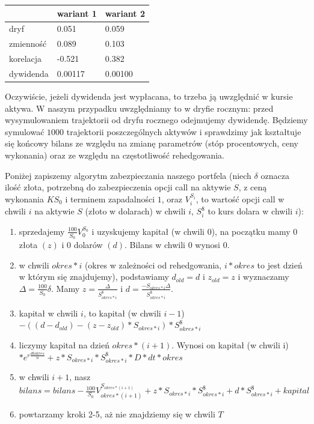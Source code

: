 \documentclass[12pt]{article}
\begin{document}
\begin{table}[h]
\begin{tabular}{|l|l|l|}
\hline
          & wariant 1 & wariant 2 \\ \hline
dryf      & 0.051     & 0.059     \\ \hline
zmienność & 0.089     & 0.103     \\ \hline
korelacja & -0.521    & 0.382     \\ \hline
dywidenda & 0.00117   & 0.00100   \\ \hline
\end{tabular}
\end{table}

\newline
Oczywiście, jeżeli dywidenda jest wypłacana, to trzeba ją uwzględnić w kursie aktywa. W naszym przypadku uwzględniamy to w dryfie rocznym: przed wysymulowaniem trajektorii od dryfu rocznego odejmujemy dywidendę.
\newline
Będziemy symulować $1000$ trajektorii poszczególnych aktywów i sprawdzimy jak kształtuje się końcowy bilans ze względu na zmianę parametrów (stóp procentowych, ceny wykonania) oraz ze względu na częstotliwość rehedgowania.


\newpage

Poniżej zapiszemy algorytm zabezpieczania naszego portfela (niech $\delta$ oznacza ilość złota, potrzebną do zabezpieczenia opcji call na aktywie $S$, z ceną wykonania $KS_0$ i terminem zapadalności $1$, oraz $V_i^{S_i}$, to wartość opcji call w chwili $i$ na aktywie $S$ (złoto w dolarach) w chwili $i$, $S_{i}^\$$ to kurs dolara w chwili $i$):
\begin{enumerate}
    \item sprzedajemy $\frac{100}{S_0}V_0^{S_0}$  i uzyskujemy kapitał (w chwili 0), na początku mamy $0$ złota $(z)$ i $0$ dolarów $(d)$. Bilans w chwili $0$ wynosi $0$.
    \item w chwili $okres*i$ (okres w zależności od rehedgowania, $i * okres$ to jest dzień w którym się znajdujemy), podstawiamy $d_{old}=d$ i $z_{old}=z$ i wyznaczamy $\Delta=\frac{100}{S_0}\delta$. Mamy $z=\frac{\Delta}{S_{okres*i}^\$}$ i $d=\frac{-S_{okres*i}\Delta}{S_{okres*i}^\$}$.
    \item kapitał w chwili $i$, to kapitał (w chwili $i-1$) $-((d-d_{old})-(z-z_{old})*S_{okres*i})*S_{okres*i}^\$$
    \item liczymy kapitał na dzień $okres*(i+1)$. Wynosi on kapitał (w chwili i) $*e^{r\frac{dt okres}{n}} + z*S_{okres*i}*S_{okres*i}^\$*D*dt*okres$ 
    \item w chwili $i+1$, nasz $bilans = bilans - \frac{100}{S_{0}}V_{okres*(i+1)}^{S_{okres*(i+1)}} + z * S_{okres*i} *  S_{okres*i}^\$ + d * S_{okres*i}^\$ +  kapital$
    \item powtarzamy kroki 2-5, aż nie znajdziemy się w chwili $T$
\end{enumerate}
\end{document}
